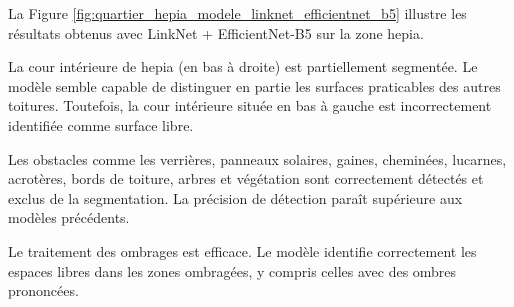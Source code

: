 
\newpage
La Figure \ref{fig:quartier_hepia_modele_linknet_efficientnet_b5} illustre les résultats obtenus avec LinkNet + EfficientNet-B5 sur la zone \acrshort{hepia}.

La cour intérieure de \acrshort{hepia} (en bas à droite) est partiellement segmentée. Le modèle semble capable de distinguer en partie les surfaces praticables des autres toitures. Toutefois, la cour intérieure située en bas à gauche est incorrectement identifiée comme surface libre.

Les obstacles comme les verrières, panneaux solaires, gaines, cheminées, lucarnes, acrotères, bords de toiture, arbres et végétation sont correctement détectés et exclus de la segmentation. La précision de détection paraît supérieure aux modèles précédents.

Le traitement des ombrages est efficace. Le modèle identifie correctement les espaces libres dans les zones ombragées, y compris celles avec des ombres prononcées.

